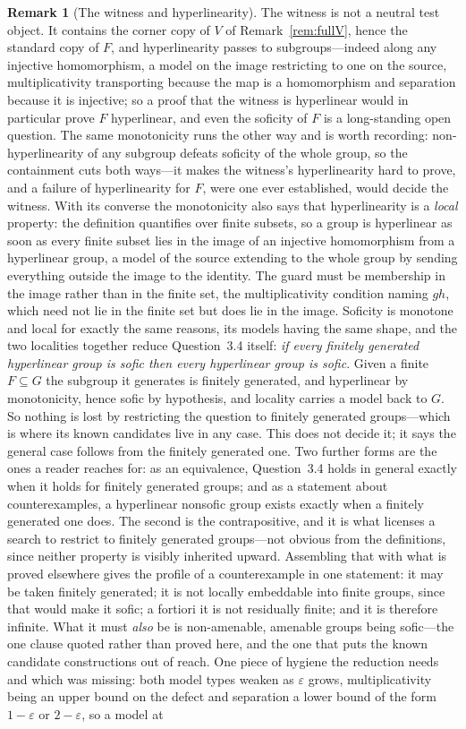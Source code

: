 \documentclass[11pt]{amsart}
\theoremstyle{definition}
\newtheorem{remark}[theorem]{Remark}
\theoremstyle{plain}
\newcommand{\eps}{\varepsilon}
\begin{document}
\begin{remark}[The witness and hyperlinearity]
The witness is not a neutral test object.  It contains the corner copy of \(V\) of Remark~\ref{rem:fullV}, hence the standard copy of \(F\), and hyperlinearity passes to subgroups---indeed along any injective homomorphism, a model on the image restricting to one on the source, multiplicativity transporting because the map is a homomorphism and separation because it is injective; so a proof that the witness is hyperlinear would in particular prove \(F\) hyperlinear, and even the soficity of \(F\) is a long-standing open question.  The same monotonicity runs the other way and is worth recording: non-hyperlinearity of any subgroup defeats soficity of the whole group, so the containment cuts both ways---it makes the witness's hyperlinearity hard to prove, and a failure of hyperlinearity for \(F\), were one ever established, would decide the witness.  With its converse the monotonicity also says that hyperlinearity is a \emph{local} property: the definition quantifies over finite subsets, so a group is hyperlinear as soon as every finite subset lies in the image of an injective homomorphism from a hyperlinear group, a model of the source extending to the whole group by sending everything outside the image to the identity.  The guard must be membership in the image rather than in the finite set, the multiplicativity condition naming \(gh\), which need not lie in the finite set but does lie in the image.  Soficity is monotone and local for exactly the same reasons, its models having the same shape, and the two localities together reduce Question~3.4 itself: \emph{if every finitely generated hyperlinear group is sofic then every hyperlinear group is sofic}.  Given a finite \(F\subseteq G\) the subgroup it generates is finitely generated, and hyperlinear by monotonicity, hence sofic by hypothesis, and locality carries a model back to \(G\).  So nothing is lost by restricting the question to finitely generated groups---which is where its known candidates live in any case.  This does not decide it; it says the general case follows from the finitely generated one.  Two further forms are the ones a reader reaches for: as an equivalence, Question~3.4 holds in general exactly when it holds for finitely generated groups; and as a statement about counterexamples, a hyperlinear nonsofic group exists exactly when a finitely generated one does.  The second is the contrapositive, and it is what licenses a search to restrict to finitely generated groups---not obvious from the definitions, since neither property is visibly inherited upward.  Assembling that with what is proved elsewhere gives the profile of a counterexample in one statement: it may be taken finitely generated; it is not locally embeddable into finite groups, since that would make it sofic; a fortiori it is not residually finite; and it is therefore infinite.  What it must \emph{also} be is non-amenable, amenable groups being sofic---the one clause quoted rather than proved here, and the one that puts the known candidate constructions out of reach.  One piece of hygiene the reduction needs and which was missing: both model types weaken as \(\eps\) grows, multiplicativity being an upper bound on the defect and separation a lower bound of the form \(1-\eps\) or \(2-\eps\), so a model at 
\end{remark}
\end{document}
